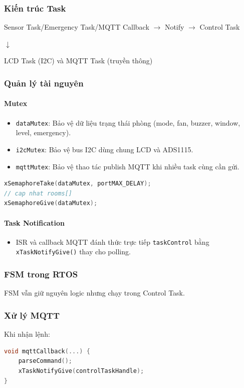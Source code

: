\documentclass[../BTL_PTIT.tex]{subfiles}
\begin{document}
\subsubsection{Kiến trúc Task}
Sensor Task/Emergency Task/MQTT Callback $\rightarrow$ Notify $\rightarrow$ Control Task

\hspace*{4em}$\downarrow$

\hspace*{2em}LCD Task (I2C) và MQTT Task (truyền thông)

\subsubsection{Quản lý tài nguyên}
\paragraph{Mutex}
\begin{itemize}[label=\textbullet]
    \item \texttt{dataMutex}: Bảo vệ dữ liệu trạng thái phòng (mode, fan, buzzer, window, level, emergency).
    \item \texttt{i2cMutex}: Bảo vệ bus I2C dùng chung LCD và ADS1115.
    \item \texttt{mqttMutex}: Bảo vệ thao tác publish MQTT khi nhiều task cùng cần gửi.
\end{itemize}

\begin{lstlisting}[language=C]
xSemaphoreTake(dataMutex, portMAX_DELAY);
// cap nhat rooms[]
xSemaphoreGive(dataMutex);
\end{lstlisting}

\paragraph{Task Notification}
\begin{itemize}[label=\textbullet]
    \item ISR và callback MQTT đánh thức trực tiếp \texttt{taskControl} bằng \texttt{xTaskNotifyGive()} thay cho polling.
\end{itemize}

\subsubsection{FSM trong RTOS}
FSM vẫn giữ nguyên logic nhưng chạy trong Control Task.

\subsubsection{Xử lý MQTT}
Khi nhận lệnh:
\begin{lstlisting}[language=C]
void mqttCallback(...) {
    parseCommand();
    xTaskNotifyGive(controlTaskHandle);
}
\end{lstlisting}
\end{document}
